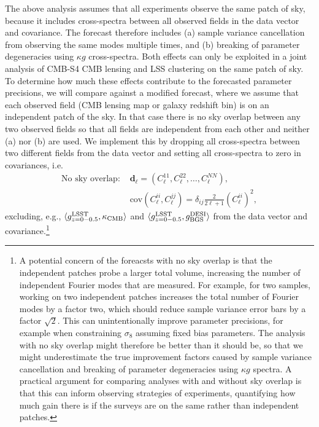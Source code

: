 \documentclass[prd,superscriptaddress,floatfix,notitlepage,nofootinbib,reprint]{revtex4-1} %
\begin{document}
The above analysis assumes that all experiments observe the same patch of sky, because it includes cross-spectra between all observed fields in the data vector and covariance. 
The forecast therefore includes (a) sample variance cancellation from observing the same modes multiple times, and (b) breaking of parameter degeneracies using $\kappa g$ cross-spectra.
Both effects can only be exploited in a joint analysis of CMB-S4 CMB lensing and LSS clustering on the same patch of sky.  
To determine how much these effects contribute to the forecasted parameter precisions, we will compare against a modified forecast, where we assume that each observed field (CMB lensing map or galaxy redshift bin) is on an independent patch of the sky.
In that case there is no sky overlap between any two observed fields so that all fields are independent from each other and neither (a) nor (b) are used.
We implement this by dropping all cross-spectra between two different fields from the data vector and setting all cross-spectra to zero in covariances, i.e.~
\begin{align}
  \label{eq:29}
  \text{No sky overlap: } & 
\textbf{d}_\ell=\left(
C^{11}_\ell, C^{22}_\ell, \dots, C^{NN}_\ell
\right),
\nonumber\\
& \mathrm{cov}\left(C^{ii}_\ell,C^{jj}_\ell\right) = \delta_{ij}\frac{2}{2\ell+1}(C^{ii}_\ell)^2,
\end{align}
excluding, e.g., $\langle g^\mathrm{LSST}_{z=0-0.5},\kappa_\mathrm{CMB}\rangle$ and $\langle g^\mathrm{LSST}_{z=0-0.5},g^\mathrm{DESI}_\mathrm{BGS}\rangle$ from the data vector and covariance.\footnote{A potential concern of the foreacsts with no sky overlap is that the independent patches probe a larger total volume, increasing the number of independent Fourier modes that are measured.
For example, for two samples, working on two independent patches increases the total number of Fourier modes by a factor two, which should reduce sample variance error bars by a factor $\sqrt{2}$.
This can unintentionally improve parameter precisions, for example when constraining $\sigma_8$ assuming fixed bias parameters.
The analysis with no sky overlap might therefore be better than it should be, so that we might underestimate the true improvement factors caused by sample variance cancellation and breaking of parameter degeneracies using $\kappa g$ spectra.
A practical argument for comparing analyses with and without sky overlap is that this can inform observing strategies of experiments, quantifying how much gain there is if the surveys are on the same  rather than independent patches.
}
\end{document}
